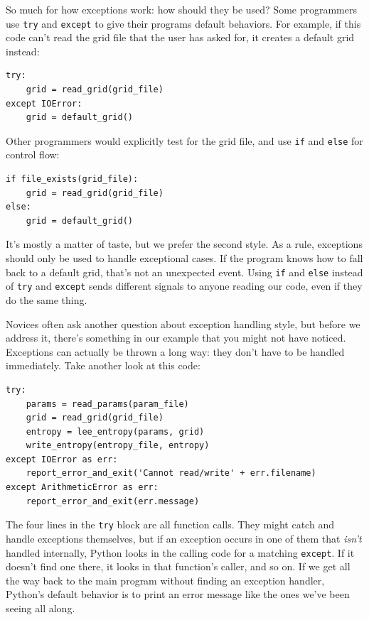 \documentclass{book}
\begin{document}
So much for how exceptions work: how should they be used? Some
programmers use \texttt{try} and \texttt{except} to give their programs
default behaviors. For example, if this code can't read the grid file
that the user has asked for, it creates a default grid instead:

\begin{verbatim}
try:
    grid = read_grid(grid_file)
except IOError:
    grid = default_grid()
\end{verbatim}

Other programmers would explicitly test for the grid file, and use
\texttt{if} and \texttt{else} for control flow:

\begin{verbatim}
if file_exists(grid_file):
    grid = read_grid(grid_file)
else:
    grid = default_grid()
\end{verbatim}

It's mostly a matter of taste, but we prefer the second style. As a
rule, exceptions should only be used to handle exceptional cases. If the
program knows how to fall back to a default grid, that's not an
unexpected event. Using \texttt{if} and \texttt{else} instead of
\texttt{try} and \texttt{except} sends different signals to anyone
reading our code, even if they do the same thing.

Novices often ask another question about exception handling style, but
before we address it, there's something in our example that you might
not have noticed. Exceptions can actually be thrown a long way: they
don't have to be handled immediately. Take another look at this code:

\begin{verbatim}
try:
    params = read_params(param_file)
    grid = read_grid(grid_file)
    entropy = lee_entropy(params, grid)
    write_entropy(entropy_file, entropy)
except IOError as err:
    report_error_and_exit('Cannot read/write' + err.filename)
except ArithmeticError as err:
    report_error_and_exit(err.message)
\end{verbatim}

The four lines in the \texttt{try} block are all function calls. They
might catch and handle exceptions themselves, but if an exception occurs
in one of them that \emph{isn't} handled internally, Python looks in the
calling code for a matching \texttt{except}. If it doesn't find one
there, it looks in that function's caller, and so on. If we get all the
way back to the main program without finding an exception handler,
Python's default behavior is to print an error message like the ones
we've been seeing all along.
\end{document}

